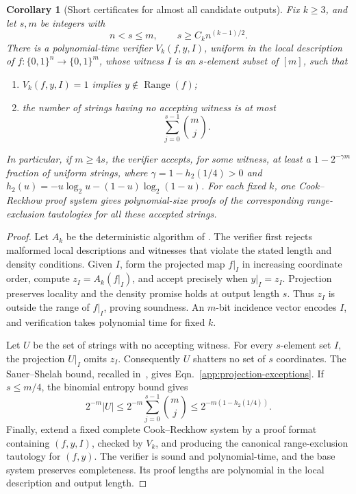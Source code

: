 \documentclass[letterpaper,11pt]{article}
\newtheorem{corollary}[theorem]{Corollary}
\theoremstyle{definition}
\begin{document}
\begin{corollary}[Short certificates for almost all candidate outputs]
\label{cor:projection-proofs}
Fix $k\ge3$, and let $s,m$ be integers with
\[
 n<s\le m,\qquad s\ge C_kn^{(k-1)/2}.
\]
There is a polynomial-time verifier $V_k(f,y,I)$, uniform in the
local description of $f:\{0,1\}^n\to\{0,1\}^m$, whose witness
$I$ is an $s$-element subset of $[m]$, such that
\begin{enumerate}
 \item $V_k(f,y,I)=1$ implies $y\notin\operatorname{Range}(f)$;
 \item the number of strings having no accepting witness is at most
 \begin{equation}\label{app:projection-exceptions}
  \sum_{j=0}^{s-1}\binom{m}{j}.
 \end{equation}
\end{enumerate}
In particular, if $m\ge4s$, the verifier accepts, for some witness,
at least a $1-2^{-\gamma m}$ fraction of uniform strings, where
$\gamma=1-h_2(1/4)>0$ and
$h_2(u)=-u\log_2u-(1-u)\log_2(1-u)$.
For each fixed $k$, one Cook--Reckhow proof system gives
polynomial-size proofs of the corresponding range-exclusion
tautologies for all these accepted strings.
\end{corollary}
\begin{proof}
Let $A_k$ be the deterministic algorithm of .
The verifier first rejects malformed local descriptions and witnesses
that violate the stated length and density conditions.
Given $I$, form the projected map $f|_I$ in increasing coordinate
order, compute $z_I=A_k(f|_I)$, and accept precisely when
$y|_I=z_I$. Projection preserves locality and the density promise
holds at output length $s$. Thus $z_I$ is outside the range of
$f|_I$, proving soundness. An $m$-bit incidence vector encodes $I$,
and verification takes polynomial time for fixed $k$.

Let $U$ be the set of strings with no accepting witness. For every
$s$-element set $I$, the projection $U|_I$ omits $z_I$.
Consequently $U$ shatters no set of $s$ coordinates. The
Sauer--Shelah bound, recalled in~\cite[Lemma~2.10]{LRZ26}, gives
Eqn.~\eqref{app:projection-exceptions}. If $s\le m/4$, the
binomial entropy bound gives
\[
 2^{-m}|U|
 \le 2^{-m}\sum_{j=0}^{s-1}\binom{m}{j}
 \le 2^{-m(1-h_2(1/4))}.
\]
Finally, extend a fixed complete Cook--Reckhow system by a proof
format containing $(f,y,I)$, checked by $V_k$, and producing the
canonical range-exclusion tautology for $(f,y)$. The verifier is
sound and polynomial-time, and the base system preserves
completeness. Its proof lengths are polynomial in the local
description and output length.
\end{proof}
\end{document}
